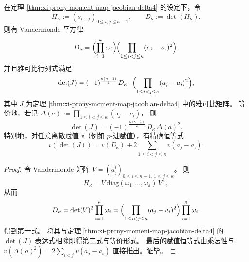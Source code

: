 \begin{corollary}\label{cor:xi-hankel-vs-prony-square-gap}
在定理 \ref{thm:xi-prony-moment-map-jacobian-delta4} 的设定下，令
\[
H_{\kappa}:=(s_{i+j})_{0\le i,j\le \kappa-1},
\qquad
D_{\kappa}:=\det(H_{\kappa}).
\]
则有 Vandermonde 平方律
\[
D_{\kappa}=\Bigl(\prod_{i=1}^{\kappa}\omega_i\Bigr)\Bigl(\prod_{1\le i<j\le \kappa}(a_j-a_i)^2\Bigr),
\]
并且雅可比行列式满足
\[
\det(J)=(-1)^{\frac{\kappa(\kappa-1)}2}\,D_{\kappa}\cdot\Bigl(\prod_{1\le i<j\le \kappa}(a_j-a_i)^2\Bigr),
\]
其中 \(J\) 为定理 \ref{thm:xi-prony-moment-map-jacobian-delta4} 中的雅可比矩阵。
等价地，若记
\(
\Delta(a):=\prod_{1\le i<j\le \kappa}(a_j-a_i)
\)，
则
\[
\det(J)=(-1)^{\frac{\kappa(\kappa-1)}2}\,D_{\kappa}\,\Delta(a)^2.
\]
特别地，对任意离散赋值 \(v\)（例如 \(p\)-进赋值），有精确恒等式
\[
v(\det(J))=v(D_{\kappa})+2\sum_{1\le i<j\le \kappa} v(a_j-a_i).
\]
\end{corollary}
\begin{proof}
令 Vandermonde 矩阵 \(V=(a_j^{i})_{0\le i\le \kappa-1,\ 1\le j\le \kappa}\)。
则
\[
H_{\kappa}=V\,\mathrm{diag}(\omega_1,\dots,\omega_\kappa)\,V^{\mathsf T},
\]
从而
\[
D_{\kappa}=\det(V)^2\prod_{i=1}^{\kappa}\omega_i
=\Bigl(\prod_{1\le i<j\le \kappa}(a_j-a_i)^2\Bigr)\prod_{i=1}^{\kappa}\omega_i,
\]
得到第一式。
将其与定理 \ref{thm:xi-prony-moment-map-jacobian-delta4} 的 \(\det(J)\) 表达式相除即得第二式与等价形式。
最后的赋值恒等式由乘法性与 \(v(\Delta(a)^2)=2\sum_{i<j}v(a_j-a_i)\) 直接推出。证毕。
\end{proof}

